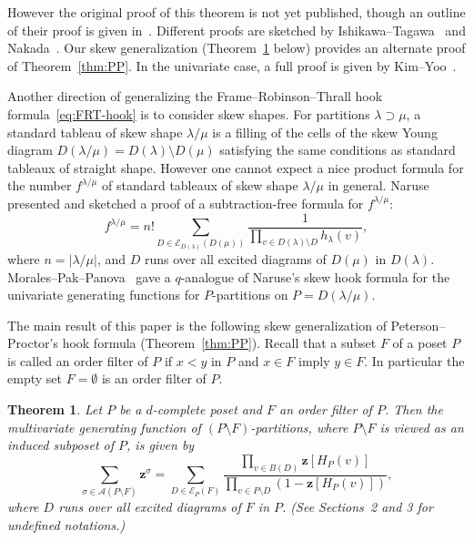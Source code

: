 \documentclass[10pt]{amsart}
\newtheorem{theo}{Theorem}[section]
\theoremstyle{definition}
\theoremstyle{remark}
\newcommand\vectz{\boldsymbol{z}}
\newcommand\AP{\mathcal{A}}
\newcommand\EE{\mathcal{E}}
\begin{document}
However the original proof of this theorem is not yet published, 
though an outline of their proof is given in~\cite{Proc3}.
Different proofs are sketched by Ishikawa--Tagawa~\cite{IT1, IT2} and Nakada~\cite{N3, N2}.
Our skew generalization (Theorem~\ref{thm:main} below) provides an alternate proof of Theorem~\ref{thm:PP}.
In the univariate case, a full proof is given by Kim--Yoo~\cite{KY}.

Another direction of generalizing the Frame--Robinson--Thrall hook formula~\eqref{eq:FRT-hook} 
is to consider skew shapes.
For partitions $\lambda \supset \mu$, 
a standard tableau of skew shape $\lambda/\mu$ is a filling of the cells of the skew Young diagram 
$D(\lambda/\mu) = D(\lambda) \setminus D(\mu)$ satisfying the same conditions as standard tableaux 
of straight shape.
However one cannot expect a nice product formula for the number $f^{\lambda/\mu}$ of 
standard tableaux of skew shape $\lambda/\mu$ in general.
Naruse~\cite{Naruse} presented and sketched a proof of a subtraction-free formula for $f^{\lambda/\mu}$:
\begin{equation}
\label{eq:Naruse-hook}
f^{\lambda/\mu}
 =
n!
\sum_{D \in \EE_{D(\lambda)}(D(\mu))} 
 \frac{ 1 }
 { \prod_{v \in D(\lambda) \setminus D} h_\lambda(v) },
\end{equation}
where $n = |\lambda/\mu|$, 
and $D$ runs over all excited diagrams of $D(\mu)$ in $D(\lambda)$.
Morales--Pak--Panova~\cite{MPP} gave a $q$-analogue of Naruse's skew hook formula 
for the univariate generating functions for $P$-partitions on $P = D(\lambda/\mu)$.

The main result of this paper is the following skew generalization of Peterson--Proctor's 
hook formula (Theorem~\ref{thm:PP}).
Recall that a subset $F$ of a poset $P$ is called an order filter of $P$ if 
$x<y$ in $P$ and $x \in F$ imply $y \in F$.
In particular the empty set $F = \emptyset$ is an order filter of $P$.

\begin{theo}
\label{thm:main}
Let $P$ be a $d$-complete poset and $F$ an order filter of $P$.
Then the multivariate generating function of $(P \setminus F)$-partitions, 
where $P \setminus F$ is viewed as an induced subposet of $P$, is given by
\begin{equation}
\label{eq:main}
\sum_{\sigma \in \AP(P \setminus F)} \vectz^\sigma
 =
\sum_{D \in \EE_P(F)}
 \frac{ \prod_{v \in B(D)} \vectz[H_P(v)] }
 { \prod_{v \in P \setminus D} ( 1 - \vectz[H_P(v)] ) },
\end{equation}
where $D$ runs over all excited diagrams of $F$ in $P$.
(See Sections~2 and 3 for undefined notations.)
\end{theo}
\end{document}
